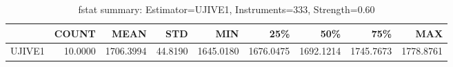 \begin{table}[ht]
\centering
\caption{fstat summary: Estimator=UJIVE1, Instruments=333, Strength=0.60}
\begin{tabular}{lrrrrrrrr}
\toprule
 & COUNT & MEAN & STD & MIN & 25\% & 50\% & 75\% & MAX \\
\midrule
UJIVE1 & 10.0000 & 1706.3994 & 44.8190 & 1645.0180 & 1676.0475 & 1692.1214 & 1745.7673 & 1778.8761 \\
\bottomrule
\end{tabular}
\end{table}
